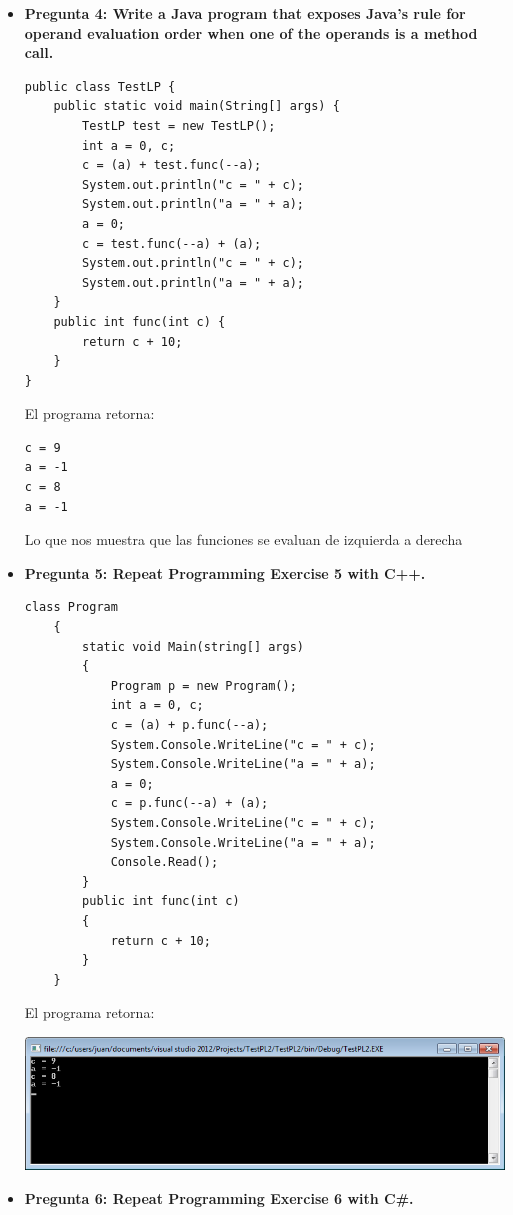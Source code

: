 \documentclass[12pt,oneside]{article}
\begin{document}
\begin{itemize}
				\item {\bf Pregunta 4: Write a Java program that exposes Java’s rule for operand evaluation order when one of the operands is a method call.}
\begin{lstlisting}[frame=single]
public class TestLP {
    public static void main(String[] args) {
        TestLP test = new TestLP();
        int a = 0, c;
        c = (a) + test.func(--a);
        System.out.println("c = " + c);
        System.out.println("a = " + a);
        a = 0;
        c = test.func(--a) + (a);
        System.out.println("c = " + c);
        System.out.println("a = " + a);
    }
    public int func(int c) {
        return c + 10;
    }
}
\end{lstlisting}
					El programa retorna:
\begin{lstlisting}[frame=single]
c = 9
a = -1
c = 8
a = -1
\end{lstlisting}
					Lo que nos muestra que las funciones se evaluan de izquierda a derecha
				\item {\bf Pregunta 5: Repeat Programming Exercise 5 with C++.}
					\lstset{language =[Sharp] C} 
					\begin{lstlisting}[frame=single]
class Program
    {
        static void Main(string[] args)
        {
            Program p = new Program();
            int a = 0, c;
            c = (a) + p.func(--a);
            System.Console.WriteLine("c = " + c);
            System.Console.WriteLine("a = " + a);
            a = 0;
            c = p.func(--a) + (a);
            System.Console.WriteLine("c = " + c);
            System.Console.WriteLine("a = " + a);
            Console.Read();
        }
        public int func(int c)
        {
            return c + 10;
        }
    }
					\end{lstlisting}
					El programa retorna:	
						\begin{center}
							\includegraphics[scale=0.7]{Imagenes/c7-02}								
						\end{center}

				\item {\bf Pregunta 6: Repeat Programming Exercise 6 with C\#.}


\end{itemize}
\end{document}
